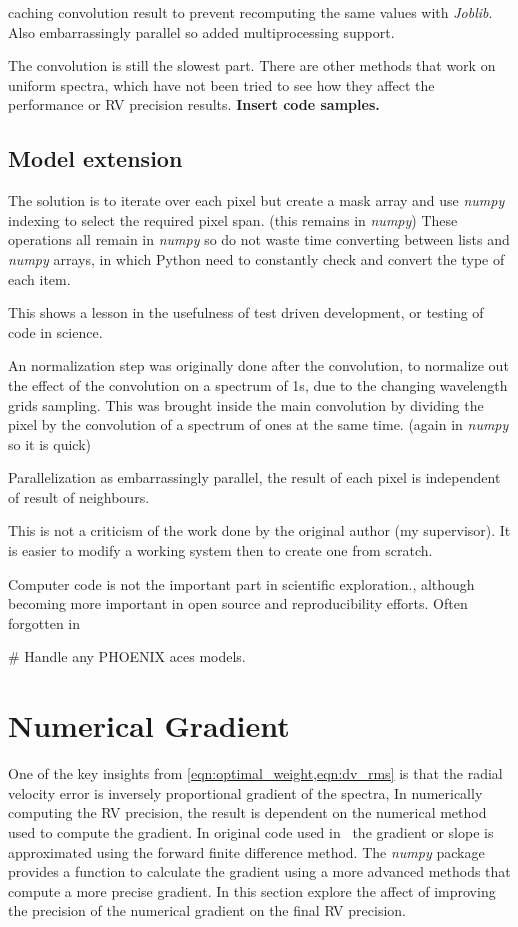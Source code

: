 {caching convolution result to prevent recomputing the same values with \emph{Joblib}.
Also embarrassingly parallel so added multiprocessing support.

The convolution is still the slowest part.
There are other methods that work on uniform spectra, which have not been tried to see how they affect the performance or {RV} precision results.
\textbf{Insert code samples.}


\subsection{Model extension}
The solution is to iterate over each pixel but create a mask array and use \emph{numpy} indexing to select the required pixel span.
(this remains in \emph{numpy})
These operations all remain in \emph{numpy} so do not waste time converting between lists and \emph{numpy} arrays, in which Python need to constantly check and convert the type of each item.

This shows a lesson in the usefulness of test driven development, or testing of code in science.


An normalization step was originally done after the convolution, to normalize out the effect of the convolution on a spectrum of 1s, due to the changing wavelength grids sampling.
This was brought inside the main convolution by dividing the pixel by the convolution of a spectrum of ones at the same time.
 (again in \emph{numpy} so it is quick)

Parallelization as embarrassingly parallel, the result of each pixel is independent of result of neighbours.

This is not a criticism of the work done by the original author (my supervisor).
It is easier to modify a working system then to create one from scratch.

Computer code is not the important part in scientific exploration., although becoming more important in open source and reproducibility efforts.
Often forgotten in

\# Handle any {PHOENIX} aces models.


\section{Numerical Gradient}
\label{sec:numerical_gradient}
One of the key insights from \cref{eqn:optimal_weight,eqn:dv_rms} is that the radial velocity error is inversely proportional gradient of the spectra, In numerically computing the {RV} precision, the result is dependent on the numerical method used to compute the gradient.
In original code used in~\citet{figueira_radial_2016} the gradient or slope is approximated using the forward finite difference method.
The \emph{numpy} package provides a function to calculate the gradient using a more advanced methods that compute a more precise gradient.
In this section  explore the affect of improving the precision of the numerical gradient on the final {RV} precision.

}
